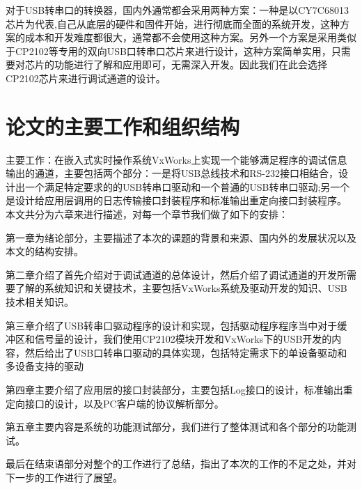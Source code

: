 	对于USB转串口的转换器，国内外通常都会采用两种方案：一种是以CY7C68013芯片为代表,自己从底层的硬件和固件开始，进行彻底而全面的系统开发，这种方案的成本和开发难度都很大，通常都不会使用这种方案。另外一个方案是采用类似于CP2102等专用的双向USB口转串口芯片来进行设计，这种方案简单实用，只需要对芯片的功能进行了解和应用即可，无需深入开发\cite{Yao2009Design}\cite{Zhou2002The}。因此我们在此会选择CP2102芯片来进行调试通道的设计。	


	

\section{论文的主要工作和组织结构}	
	主要工作：在嵌入式实时操作系统VxWorks上实现一个能够满足程序的调试信息输出的通道，主要包括两个部分：一是将USB总线技术和RS-232接口相结合，设计出一个满足特定要求的的USB转串口驱动和一个普通的USB转串口驱动;另一个是设计给应用层调用的日志传输接口封装程序和标准输出重定向接口封装程序。\\
 本文共分为六章来进行描述，对每一个章节我们做了如下的安排：
 
 第一章为绪论部分，主要描述了本次的课题的背景和来源、国内外的发展状况以及本文的结构安排。
 
 第二章介绍了首先介绍对于调试通道的总体设计，然后介绍了调试通道的开发所需要了解的系统知识和关键技术，主要包括VxWorks系统及驱动开发的知识、USB技术相关知识。
 
 第三章介绍了USB转串口驱动程序的设计和实现，包括驱动程序程序当中对于缓冲区和信号量的设计，我们使用CP2102模块开发和VxWorks下的USB开发的内容，然后给出了USB口转串口驱动的具体实现，包括特定需求下的单设备驱动和多设备支持的驱动
 
 第四章主要介绍了应用层的接口封装部分，主要包括Log接口的设计，标准输出重定向接口的设计，以及PC客户端的协议解析部分。
 
 第五章主要内容是系统的功能测试部分，我们进行了整体测试和各个部分的功能测试。
 
 最后在结束语部分对整个的工作进行了总结，指出了本次的工作的不足之处，并对下一步的工作进行了展望。 

